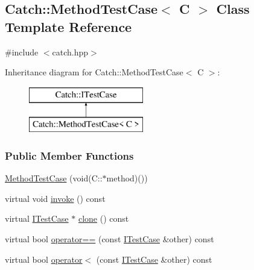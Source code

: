 \hypertarget{classCatch_1_1MethodTestCase}{\subsection{Catch\-:\-:Method\-Test\-Case$<$ C $>$ Class Template Reference}
\label{classCatch_1_1MethodTestCase}
}


{\ttfamily \#include $<$catch.\-hpp$>$}

Inheritance diagram for Catch\-:\-:Method\-Test\-Case$<$ C $>$\-:\begin{figure}[H]
\begin{center}
\leavevmode
\includegraphics[height=2.000000cm]{classCatch_1_1MethodTestCase}
\end{center}
\end{figure}
\subsubsection*{Public Member Functions}
\begin{DoxyCompactItemize}
\item 
\hyperlink{classCatch_1_1MethodTestCase_a7b043b85dae371358255dd9dc6582e7b}{Method\-Test\-Case} (void(C\-::$\ast$method)())
\item 
virtual void \hyperlink{classCatch_1_1MethodTestCase_a39cc4b760dd71adc3f7550bc1e7eb697}{invoke} () const 
\item 
virtual \hyperlink{structCatch_1_1ITestCase}{I\-Test\-Case} $\ast$ \hyperlink{classCatch_1_1MethodTestCase_a11448e37336915c7f93d470b4c517961}{clone} () const 
\item 
virtual bool \hyperlink{classCatch_1_1MethodTestCase_a78295dacec5d279e6ea312c6af9aebb0}{operator==} (const \hyperlink{structCatch_1_1ITestCase}{I\-Test\-Case} \&other) const 
\item 
virtual bool \hyperlink{classCatch_1_1MethodTestCase_ac411bdeb5057d7e32ef64e1287debbef}{operator$<$} (const \hyperlink{structCatch_1_1ITestCase}{I\-Test\-Case} \&other) const 
\end{DoxyCompactItemize}


